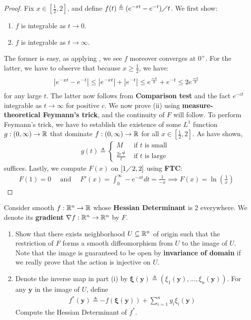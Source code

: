 \documentclass{report}
\begin{document}
\begin{proof}
Fix $x \in [\frac{1}{2},2]$, and  define $f(t)\triangleq (e^{-xt}-e^{-t})\diagup t$. We first show: 
\begin{enumerate}[label=(\roman*)]
  \item $f$ is integrable as $t \rightarrow 0$.
  \item $f$ is integrable as $t \rightarrow  \infty$.   
\end{enumerate}
The former is easy, as applying   , we see $f$ moreover converges at $0^+$. For the latter, we have to observe that because $x\geq \frac{1}{2}$, we have:   
\begin{align}
\label{b1}
\left|e^{-xt}-e^{-t}\right|\leq \left|e^{-xt}\right|+ \left|e^{-t}\right|\leq e^{\frac{-t}{2}}+ e^{-t}\leq 2e^{\frac{-t}{2}}
\end{align}
for any large $t$. The latter now follows from \textbf{Comparison test} and the fact $e^{-ct}$ integrable as $t \rightarrow \infty$ for positive $c$. We now prove (ii) using \textbf{measure-theoretical Feymann's trick}, and the continuity of $F$ will follow. To perform Feymann's trick, we have to establish the existence of some $L^1$ function $g:(0,\infty)\rightarrow \mathbb{R}$ that dominate $f:(0,\infty)\rightarrow \mathbb{R}$ for all $x\in [\frac{1}{2},2]$. As  have shown, 
\begin{align*}
g(t)\triangleq \begin{cases}
  M& \text{ if $t$ is small }\\
  \frac{2e^{\frac{-t}{2}}}{t}& \text{ if $t$ is large } 
\end{cases}
\end{align*}
suffices. Lastly, we compute $F(x)$ on $[1\diagup 2,2]$ using  \textbf{FTC}: 
\begin{align*}
 F(1)=0\quad \text{ and }\quad F'(x)= \int_0^{\infty} -e^{-xt}dt= \frac{1}{-x} \implies F(x)= \ln \left(\frac{1}{x} \right)
\end{align*}
\end{proof} 
\begin{question}{}{}
  Consider smooth $f:\mathbb{R}^n\rightarrow \mathbb{R}$ whose \textbf{Hessian Determinant} is $2$  everywhere. We denote its \textbf{gradient} $\nabla f:\mathbb{R}^n\rightarrow \mathbb{R}^n$ by $F$.  
\begin{enumerate}[label=(\roman*)]
  \item Show that there exists neighborhood $U \subseteq \mathbb{R}^n$ of origin such that the restriction of $F$ forms a smooth diffeomorphism from $U$ to the image of  $U$. Note that the image is guaranteed to be open by \textbf{invariance of domain} if we really prove that the action is injective on $U$.  
\item Denote the inverse map in part (i) by $\boldsymbol{\xi}(\textbf{y})\triangleq (\xi_1 (\textbf{y}),\dots ,\xi_n(\textbf{y}))$. For any $\textbf{y}$ in the image of $U$, define
\begin{align*}
  f^*(\textbf{y})\triangleq -f (\boldsymbol{\xi}(\textbf{y}))+ \sum_{i=1}^n y_i \xi_i (\textbf{y})
\end{align*}
Compute the Hessian Determinant of $f^*$. 
\end{enumerate}
\end{question}
\end{document}
